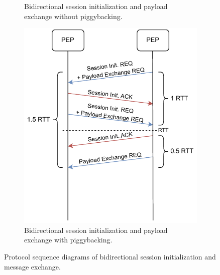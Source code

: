 \begin{description}
\begin{figure}
\begin{subfigure}[t]{0.48\linewidth}
            \caption{Bidirectional session initialization and payload exchange without piggybacking.}
            \label{fig:sabaac_accesscontrol_initialization_rtt_nopiggyback}
        \end{subfigure}
        \hfill
        \begin{subfigure}[t]{0.48\linewidth}
            \centering
            \includegraphics[width=\linewidth]{figures/SABAAC_protocols_accesscontrol_initialization_rtt_piggyback.drawio.pdf}
            \caption{Bidirectional session initialization and payload exchange with piggybacking.}
            \label{fig:sabaac_accesscontrol_initialization_rtt_piggyback}
        \end{subfigure}
        \caption{Protocol sequence diagrams of bidirectional session initialization and message exchange.
        }
        \label{fig:sabaac_accesscontrol_initialization_rtt}
    \end{figure}
\end{description}


